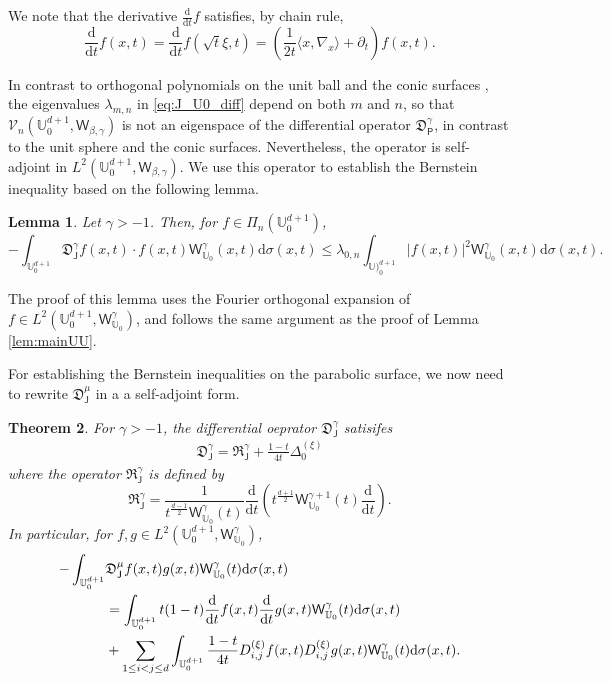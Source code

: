 \documentclass{amsart}
\newtheorem{thm}{Theorem}[section]
\newtheorem{lem}[thm]{Lemma}
\theoremstyle{remark}
\def\la{{\langle}}
\def\ra{{\rangle}}
\def\d{\mathrm{d}}
\def\sJ{{\mathsf J}}
\def\sP{{\mathsf P}}
\def\sW{{\mathsf W}}
\def\fD{{\mathfrak D}}
\def\fR{{\mathfrak R}}
\def\b{{\beta}}
\def\g{{\gamma}}
\def\l{{\lambda}}
\def\s{\sigma}
\def\la{{\langle}}
\def\ra{{\rangle}}
\def\CV{{\mathcal V}}
\def\UU{{\mathbb U}}
\def\f{\frac}
\begin{document}
We note that the derivative $\frac{\d} {\d t} f$ satisfies, by chain rule, 
\begin{equation} \label{eq:diff_t =}
\frac{\d} {\d t} f(x,t) = \frac{\d} {\d t}  f\left(\sqrt{t} \xi,t\right)  = \left(\frac{1}{2 t} \la x, \nabla_x \ra + \partial_t\right) f(x,t).  
\end{equation} 

In contrast to orthogonal polynomials on the unit ball and the conic surfaces \cite{DX, X21}, the eigenvalues
$\l_{m,n}$ in \eqref{eq:J_U0_diff} depend on both $m$ and $n$, so that $\CV_n(\UU_0^{d+1}, \sW_{\b,\g})$
is not an eigenspace of the differential operator $\fD^{\g}_{\sP}$, in contrast to the unit sphere and the conic
surfaces. Nevertheless, the operator is self-adjoint in $L^2\left(\UU_0^{d+1}, \sW_{\b,\g}\right)$. 
We use this operator to establish the Bernstein inequality based on the following lemma. 

\begin{lem}\label{lem:mainUU0}
Let $\g > -1$. Then, for $f \in \Pi_n(\UU_0^{d+1})$,  
$$
  - \int_{\UU_0^{d+1}} \fD_{\sJ}^{\g} f(x,t) \cdot f(x,t) \sW_{\UU_0}^\g(x,t) \d \s(x, t) 
       \le  \l_{0,n} \int_{\UU)_0^{d+1}} |f(x,t)|^2\sW_{\UU_0}^\g(x,t) \d \s(x, t).
$$
\end{lem}

The proof of this lemma uses the Fourier orthogonal expansion of $f \in L^2(\UU_0^{d+1}, \sW_{\UU_0}^\g)$, 
and follows the same argument as the proof of Lemma \ref{lem:mainUU}. 

For establishing the Bernstein inequalities on the parabolic surface, we now need to rewrite $\fD_\sJ^\mu$ in a
a self-adjoint form. 

\begin{thm} \label{thm:fD-UU0}
For $\g > -1$, the differential oeprator $\fD_{\sJ}^\g$ satisifes
\begin{align}\label{eq:J_U0_diff2}
 \fD_{\sJ}^\g = \fR_{\sJ}^\g + \frac{1-t}{4 t} \Delta_0^{(\xi)}
\end{align}
where the operator $\fR_\sJ^\g$ is defined by
$$
 \fR_{\sJ}^\g = \frac1{t^{\f {d-1} 2}  \sW_{\UU_0}^\g(t) }\frac{\d}{\d t} \left(t^{\f {d+1}{2}}  \sW_{\UU_0}^{\g+1}(t) \frac{\d}{\d t} \right).
$$
In particular, for $f, g  \in L^2\left(\UU_0^{d+1},  \sW_{\UU_0}^\g\right)$, 
\begin{align} \label{eq:int_U01}
  - \int_{\UU_0^{d+1}} &  \fD_{\sJ}^{\mu} f(x,t)  g (x,t)   \sW_{\UU_0}^\g (t) \d \s (x,t) \\
    & =  \int_{\UU_0^{d+1}} t(1-t) \frac{\d}{\d t} f(x,t) \frac{\d}{\d t} g (x,t)  \sW_{\UU_0}^\g (t) \d \s (x,t) \notag \\ 
    & +  \sum_{1 \le i < j \le d} \int_{\UU_0^{d+1}} \frac{1-t}{4t} D_{i,j}^{(\xi)} f(x,t) D_{i,j}^{(\xi)} g (x,t) \sW_{\UU_0}^\g (t) \d \s (x,t). 
    \notag
\end{align}
\end{thm}
\end{document}
